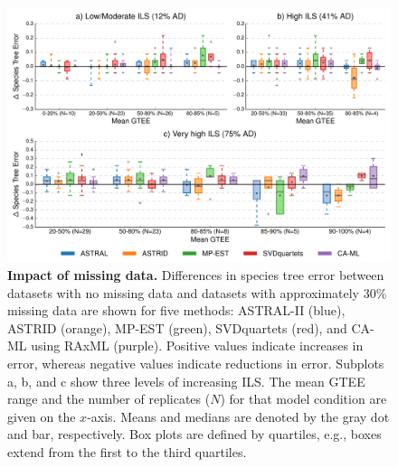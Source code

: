 \begin{figure}[!h]
\centering
\includegraphics[width=1.0\textwidth]{figures/gene-filtering-fig2.pdf}
\caption{{\bf Impact of missing data.} Differences in species tree error between datasets with no missing data and datasets with approximately 30\% missing data are shown for five methods: ASTRAL-II (blue), ASTRID (orange), MP-EST (green), SVDquartets (red), and CA-ML using RAxML (purple). 
Positive values indicate increases in error, whereas negative values indicate reductions in error. 
Subplots a, b, and c show three levels of increasing ILS. 
The mean GTEE range and the number of replicates ($N$) for that model condition are given on the $x$-axis. 
Means and medians are denoted by the gray dot and bar, respectively. 
Box plots are defined by quartiles, e.g., boxes extend from the first to the third quartiles.}
\label{fig:include-2}
\end{figure}

\afterpage{\clearpage}

